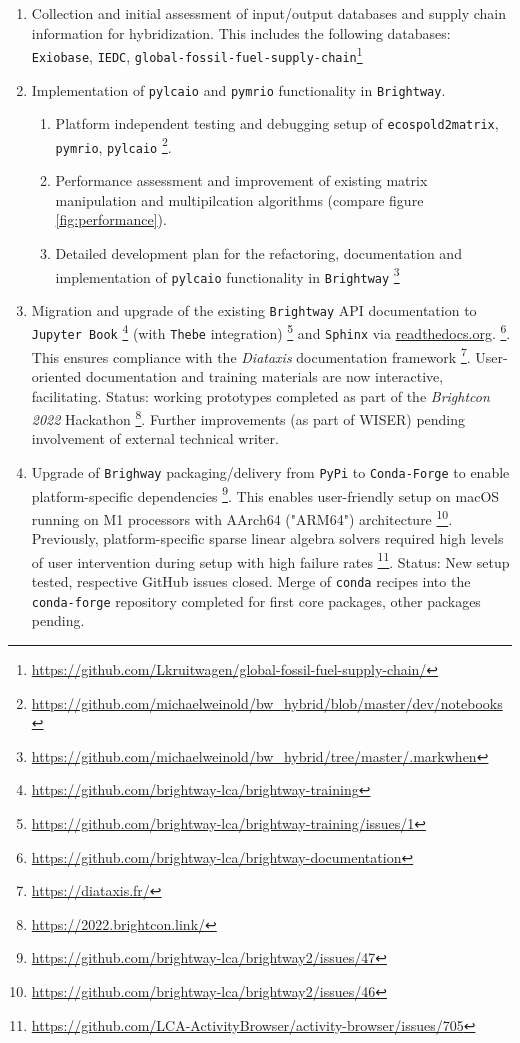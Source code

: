 \documentclass{article}
\begin{document}
    \begin{enumerate}
        \item Collection and initial assessment of input/output databases and supply chain information for hybridization. This includes the following databases: \texttt{Exiobase}, \texttt{IEDC}, \texttt{global-fossil-fuel-supply-chain}\footnote{\url{https://github.com/Lkruitwagen/global-fossil-fuel-supply-chain/}}
        \item
            Implementation of \texttt{pylcaio} and \texttt{pymrio} functionality in \texttt{Brightway}.
            \begin{enumerate}
                \item
                    Platform independent testing and debugging setup of \texttt{ecospold2matrix}, \texttt{pymrio}, \texttt{pylcaio} \footnote{\url{https://github.com/michaelweinold/bw_hybrid/blob/master/dev/notebooks}}.
                \item
                    Performance assessment and improvement of existing matrix manipulation and multipilcation algorithms (compare figure \ref{fig:performance}).
                \item
                    Detailed development plan for the refactoring, documentation and implementation of \texttt{pylcaio} functionality in \texttt{Brightway} \footnote{\url{https://github.com/michaelweinold/bw_hybrid/tree/master/.markwhen}}
            \end{enumerate}
        \item
            Migration and upgrade of the existing \texttt{Brightway} API documentation to \texttt{Jupyter Book} \footnote{\url{https://github.com/brightway-lca/brightway-training}} (with \texttt{Thebe} integration) \footnote{\url{https://github.com/brightway-lca/brightway-training/issues/1}} and \texttt{Sphinx} via \url{readthedocs.org}.  \footnote{\url{https://github.com/brightway-lca/brightway-documentation}}. This ensures compliance with the  \textit{Diataxis} documentation framework \footnote{\url{https://diataxis.fr/}}. User-oriented documentation and training materials are now interactive, facilitating. Status: working prototypes completed as part of the \textit{Brightcon 2022} Hackathon \footnote{\url{https://2022.brightcon.link/}}. Further improvements (as part of WISER) pending involvement of external technical writer.
        \item
            Upgrade of \texttt{Brighway} packaging/delivery from \texttt{PyPi} to \texttt{Conda-Forge} to enable platform-specific dependencies \footnote{\url{https://github.com/brightway-lca/brightway2/issues/47}}. This enables user-friendly setup on macOS running on M1 processors with AArch64 ("ARM64") architecture \footnote{\url{https://github.com/brightway-lca/brightway2/issues/46}}. Previously, platform-specific sparse linear algebra solvers required high levels of user intervention during setup with high failure rates \footnote{\url{https://github.com/LCA-ActivityBrowser/activity-browser/issues/705}}. Status: New setup tested, respective GitHub issues closed. Merge of \texttt{conda} recipes into the \texttt{conda-forge} repository completed for first core packages, other packages pending.
    \end{enumerate}
\end{document}
